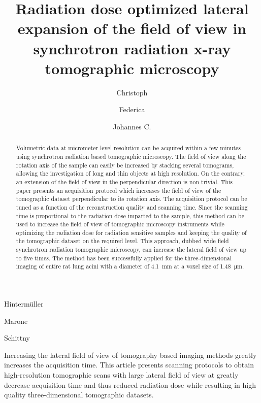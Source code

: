 \documentclass[preprint,s]{iucr}
\begin{document}
\title{Radiation dose optimized lateral expansion of the field of view in synchrotron radiation x-ray tomographic microscopy}

\author[b,c]{Christoph}{Hinterm\"{u}ller}{}{}
\author[b]{Federica}{Marone}{}{}
\author[a]{Johannes C.}{Schittny}{}{}



\maketitle

\begin{synopsis}
Increasing the lateral field of view of tomography based imaging methods greatly increases the acquisition time. This article presents scanning protocols to obtain high-resolution tomographic scans with large lateral field of view at greatly decrease acquisition time and thus reduced radiation dose while resulting in high quality three-dimensional tomographic datasets.
\end{synopsis}

\begin{abstract}
Volumetric data at micrometer level resolution can be acquired within a few minutes using synchrotron radiation based tomographic microscopy. The field of view along the rotation axis of the sample can easily be increased by stacking several tomograms, allowing  the investigation of long and thin objects at high resolution. On the contrary, an extension of the field of view in the perpendicular direction is non trivial. This paper presents an acquisition protocol which increases the field of view of the tomographic dataset perpendicular to its rotation axis. The acquisition protocol can be tuned as a function of the reconstruction quality and scanning time. Since the scanning time is proportional to the radiation dose imparted to the sample, this method can be used to increase the field of view of tomographic microscopy instruments while optimizing the radiation dose for radiation sensitive samples and keeping the quality of the tomographic dataset on the required level. This approach, dubbed wide field synchrotron radiation tomographic microscopy, can increase the lateral field of view up to five times. The method has been successfully applied for the three-dimensional imaging of entire rat lung acini with a diameter of \SI{4.1}{\milli\meter} at a voxel size of \SI{1.48}{\micro\meter}.
\end{abstract}
\end{document}
